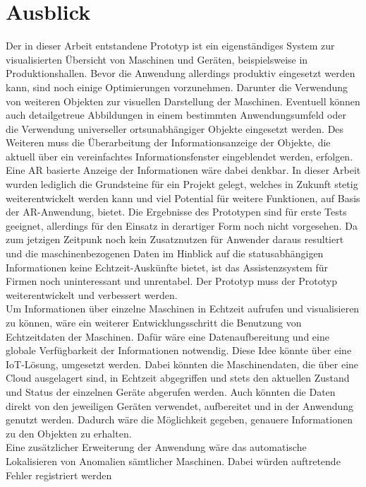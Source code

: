 \chapter{Ausblick}
\label{chap:Ausblick}
Der in dieser Arbeit entstandene Prototyp ist ein eigenständiges System zur visualisierten Übersicht von Maschinen und Geräten, beispielsweise in Produktionshallen. 
Bevor die Anwendung allerdings produktiv eingesetzt werden kann, sind noch einige Optimierungen vorzunehmen. Darunter die Verwendung von weiteren Objekten 
zur visuellen Darstellung der Maschinen. Eventuell können auch detailgetreue Abbildungen in einem bestimmten Anwendungsumfeld oder die Verwendung universeller 
ortsunabhängiger Objekte eingesetzt werden. Des Weiteren muss die Überarbeitung der Informationsanzeige der Objekte, die aktuell über ein vereinfachtes Informationsfenster 
eingeblendet werden, erfolgen. Eine \acl{AR} basierte Anzeige der Informationen wäre dabei denkbar. In dieser Arbeit wurden lediglich die Grundsteine für ein Projekt 
gelegt, welches in Zukunft stetig weiterentwickelt werden kann und viel Potential für weitere Funktionen, auf Basis der \acs{AR}-Anwendung, bietet. Die Ergebnisse 
des Prototypen sind für erste Tests geeignet, allerdings für den %
Einsatz in derartiger Form noch nicht vorgesehen. Da zum jetzigen Zeitpunk noch kein Zusatznutzen für Anwender 
daraus resultiert und die maschinenbezogenen Daten im Hinblick auf die statusabhängigen Informationen keine Echtzeit-Auskünfte bietet, ist das Assistenzsystem für Firmen 
noch uninteressant und unrentabel. Der Prototyp muss der Prototyp weiterentwickelt und verbessert werden. 
\\ 
\linebreak
Um Informationen über einzelne Maschinen in Echtzeit aufrufen und visualisieren zu können, wäre ein weiterer Entwicklungsschritt die Benutzung von Echtzeitdaten der 
Maschinen. Dafür wäre eine Datenaufbereitung und eine globale Verfügbarkeit der Informationen notwendig. Diese Idee könnte über eine \acl{IoT}-Lösung, umgesetzt werden. 
Dabei könnten die Maschinendaten, die über eine Cloud ausgelagert sind, in Echtzeit abgegriffen und stets den aktuellen Zustand und Status der einzelnen Geräte 
abgerufen werden. Auch könnten die Daten direkt von den jeweiligen Geräten verwendet, aufbereitet und in der Anwendung genutzt werden. Dadurch wäre die Möglichkeit 
gegeben, genauere Informationen zu den Objekten zu erhalten.
\\ 
\linebreak
Eine zusätzlicher Erweiterung der Anwendung wäre das automatische Lokalisieren von Anomalien sämtlicher Maschinen. Dabei würden auftretende Fehler registriert werden 
